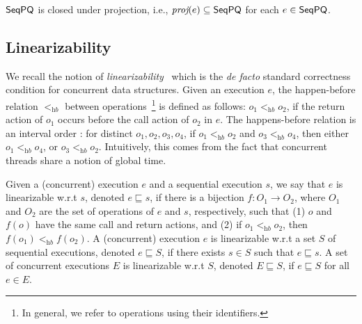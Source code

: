 \begin{lemma}\label{lem:closure_proj}
$\mathsf{SeqPQ}$ is closed under projection, i.e., $\textit{proj}(e)\subseteq \mathsf{SeqPQ}$ for each $e\in \mathsf{SeqPQ}$.
\end{lemma}


\subsection{Linearizability}\label{ssec:lin}

%
We recall the notion of \emph{linearizability}~\cite{journals/toplas/HerlihyW90} which is the \emph{de facto} standard correctness condition for concurrent data structures.
Given an execution $e$, the happen-before relation $<_{\textit{hb}}$ between operations~\footnote{In general, we refer to operations using their identifiers.} is defined as follows: $o_1 <_{\textit{hb}} o_2$, if the return action of $o_1$ occurs before the call action of $o_2$ in $e$. The happens-before relation is an interval order \cite{DBLP:conf/popl/BouajjaniEEH15}: for distinct $o_1,o_2,o_3,o_4$, if $o_1 <_{\textit{hb}} o_2$ and $o_3 <_{\textit{hb}} o_4$, then either $o_1 <_{\textit{hb}} o_4$, or $o_3 <_{\textit{hb}} o_2$. Intuitively, this comes from the fact that concurrent threads share a notion of global time.

Given a (concurrent) execution $e$ and a sequential execution $s$, we say that $e$ is linearizable w.r.t $s$, denoted $e \sqsubseteq s$, if there is a bijection $f: O_1 \rightarrow O_2$, where $O_1$ and $O_2$ are the set of operations of $e$ and $s$, respectively, such that (1) $o$ and $f(o)$ have the same call and return actions, and (2) if $o_1 <_{\textit{hb}} o_2$, then $f(o_1) <_{\textit{hb}} f(o_2)$.
A (concurrent) execution $e$ is linearizable w.r.t a set $S$ of sequential executions, denoted $e \sqsubseteq S$, if there exists $s \in S$ such that $e \sqsubseteq s$. A set of concurrent executions $E$ is linearizable w.r.t $S$, denoted $E \sqsubseteq S$, if $e \sqsubseteq S$ for all $e \in E$.

